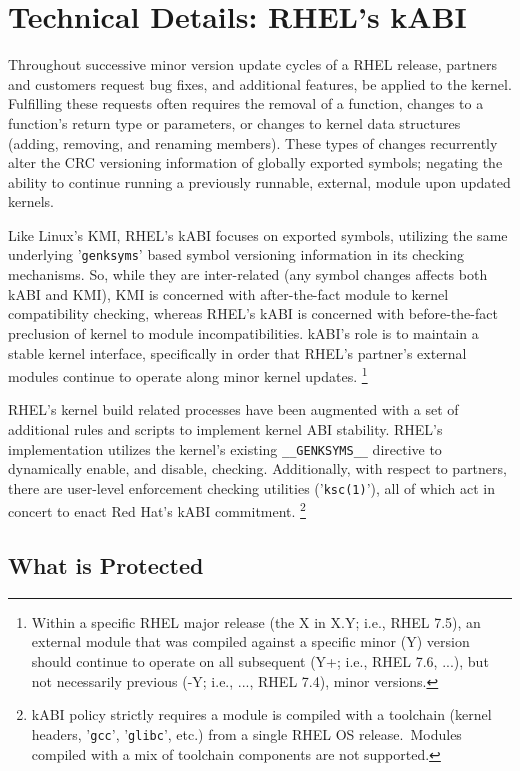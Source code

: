 \documentclass[10pt,oneside,english]{book}
\begin{document}
\chapter{Technical Details: RHEL's kABI}

Throughout successive minor version update cycles of a RHEL release,
partners and customers request bug fixes, and additional features,
be applied to the kernel. Fulfilling these requests often requires
the removal of a function, changes to a function's return type or
parameters, or changes to kernel data structures (adding, removing,
and renaming members). These types of changes recurrently alter the
CRC versioning information of globally exported symbols; negating
the ability to continue running a previously runnable, external, module
upon updated kernels.

Like Linux's KMI, RHEL's kABI focuses on exported symbols, utilizing
the same underlying '\texttt{genksyms}' based symbol versioning information
in its checking mechanisms. So, while they are inter-related (any
symbol changes affects both kABI and KMI), KMI is concerned with after-the-fact
module to kernel compatibility checking, whereas RHEL's kABI is concerned
with before-the-fact preclusion of kernel to module incompatibilities.
kABI's role is to maintain a stable kernel interface, specifically
in order that RHEL's partner's external modules continue to operate
along minor kernel updates. \footnote{\label{fn:c3f1}Within a specific RHEL major release (the X in X.Y;
i.e., RHEL 7.5), an external module that was compiled against a specific
minor (Y) version should continue to operate on all subsequent (Y+;
i.e., RHEL 7.6, ...), but not necessarily previous (-Y; i.e., ...,
RHEL 7.4), minor versions.}

RHEL's kernel build related processes have been augmented with a set
of additional rules and scripts to implement kernel ABI stability.
RHEL's implementation utilizes the kernel's existing \texttt{\_\_GENKSYMS\_\_}
directive to dynamically enable, and disable, checking. Additionally,
with respect to partners, there are user-level enforcement checking
utilities ('\texttt{ksc(1)}'), all of which act in concert to enact
Red Hat's kABI commitment. \footnote{kABI policy strictly requires a module is compiled with a toolchain
(kernel headers, '\texttt{gcc}', '\texttt{glibc}', etc.) from a single
RHEL OS release. Modules compiled with a mix of toolchain components
are not supported.}

\section{What is Protected}
\end{document}
